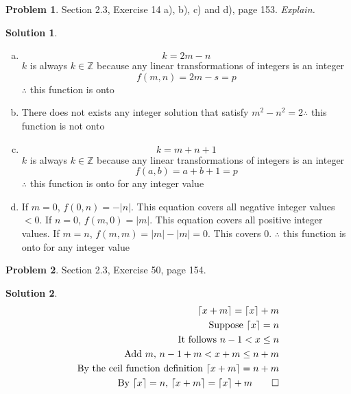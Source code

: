 \documentclass{article}
\theoremstyle{definition}
\newtheorem{problem}{Problem}
\newtheorem*{solution}{Solution}
\begin{document}
\begin{problem} Section 2.3, Exercise 14 a), b), c) and d), page 153. \textsl{Explain.}
\end{problem}
\begin{solution}\ \\
\begin{enumerate}[a)]
  \item
  \begin{equation}
    k = 2m - n
  \end{equation}
  $k$ is always $k \in \mathbb{Z}$ because any linear transformations of integers is an integer
  \begin{equation}
    f(m,n) = 2m - s = p
  \end{equation}
  $\therefore$ this function is onto
  
  \item
  There does not exists any integer solution that satisfy $m^2 - n^2 = 2 \therefore$ this function is not onto
  \item
  \begin{equation}
    k = m + n + 1
  \end{equation}
  $k$ is always $k \in \mathbb{Z}$ because any linear transformations of integers is an integer
  \begin{equation}
    f(a,b) = a + b + 1 = p
  \end{equation}
  $\therefore$ this function is onto for any integer value
  \item
  If $m = 0$, $f(0,n) = - |n|$. This equation covers all negative integer values $<0$. If $n=0$, $f(m,0) = |m|$. This equation covers all positive integer values. If $m=n$, $f(m,m) = |m| - |m| = 0$. This covers 0. $\therefore$ this function is onto for any integer value 
  
\end{enumerate}
\end{solution}

\begin{problem} Section 2.3, Exercise 50, page 154. 
\end{problem}
\begin{solution}
\begin{align*}
  \left \lceil x + m \right \rceil = \lceil x \rceil + m \\
  \text{Suppose }\lceil x \rceil = n \\
  \text{It follows } n-1 < x \leq n \\
  \text{Add $m$, } n-1 +m < x + m \leq n + m \\
  \text{By the ceil function definition } \lceil x + m \rceil = n + m \\
  \text{By $\lceil x \rceil = n$, }\lceil x + m \rceil = \lceil x \rceil + m \qed
\end{align*}
\end{solution}
\end{document}
